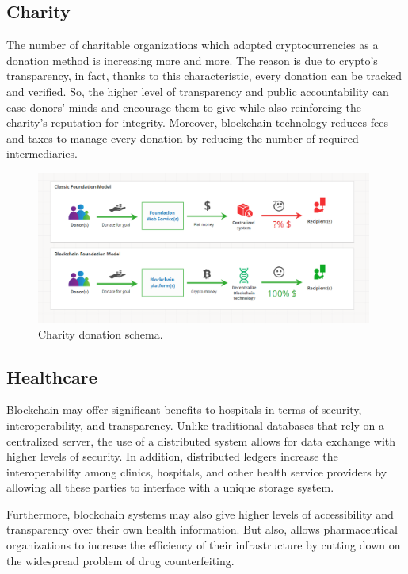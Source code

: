 \subsection{Charity}
\label{sec:charity}

The number of charitable organizations which adopted cryptocurrencies as a donation
method is increasing more and more. The reason is due to crypto's transparency,
in fact, thanks to this characteristic, every donation can be tracked and verified.
So, the higher level of transparency and public accountability can ease donors' minds 
and encourage them to give while also reinforcing the charity's reputation for integrity.
Moreover, blockchain technology reduces fees and taxes to manage every donation by
reducing the number of required intermediaries.\cite{binancevision}

\begin{figure}[h]
    \centering
    \includegraphics[height=5cm]{charity.png}
    \caption{Charity donation schema.\cite{cointelegraph}}
    \label{fig:donation}
\end{figure}

\subsection{Healthcare}
\label{sec:healthcare}

Blockchain may offer significant benefits to hospitals in terms of security, 
interoperability, and transparency. Unlike traditional databases that rely on a centralized
server, the use of a distributed system allows for data exchange with higher levels of 
security. In addition, distributed ledgers increase the interoperability among clinics,
hospitals, and other health service providers by allowing all these parties to interface
with a unique storage system.

Furthermore, blockchain systems may also give higher levels of accessibility and 
transparency over their own health information. But also, allows pharmaceutical 
organizations to increase the efficiency of their infrastructure by cutting 
down on the widespread problem of drug counterfeiting.\cite{binancevision}

